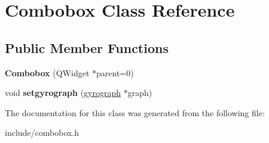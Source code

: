 \hypertarget{class_combobox}{\section{Combobox Class Reference}
\label{class_combobox}
}
\subsection*{Public Member Functions}
\begin{DoxyCompactItemize}
\item 
\hypertarget{class_combobox_a3fbfc1e007fc42bf795758bc7469beee}{{\bfseries Combobox} (Q\-Widget $\ast$parent=0)}\label{class_combobox_a3fbfc1e007fc42bf795758bc7469beee}

\item 
\hypertarget{class_combobox_a7bd95b3ac900c60a340aa5d7f681a07c}{void {\bfseries setgyrograph} (\hyperlink{classgyrograph}{gyrograph} $\ast$graph)}\label{class_combobox_a7bd95b3ac900c60a340aa5d7f681a07c}

\end{DoxyCompactItemize}


The documentation for this class was generated from the following file\-:\begin{DoxyCompactItemize}
\item 
include/combobox.\-h\end{DoxyCompactItemize}
